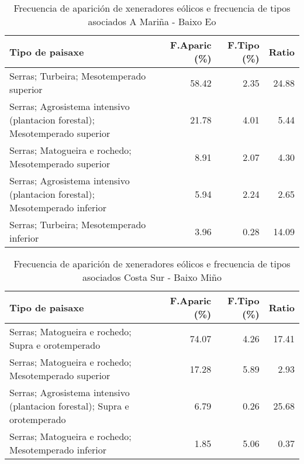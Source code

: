 \begin{table}[p]
\centering
\caption{Frecuencia de aparición de xeneradores eólicos e frecuencia de tipos asociados A Mariña - Baixo Eo} 
\label{veolico2}
\begin{tabular}{lrrr}
  \hline
Tipo de paisaxe & F.Aparic (\%) & F.Tipo (\%) & Ratio \\ 
  \hline
Serras; Turbeira; Mesotemperado superior & 58.42 & 2.35 & 24.88 \\ 
  Serras; Agrosistema intensivo (plantacion forestal); Mesotemperado superior & 21.78 & 4.01 & 5.44 \\ 
  Serras; Matogueira e rochedo; Mesotemperado superior & 8.91 & 2.07 & 4.30 \\ 
  Serras; Agrosistema intensivo (plantacion forestal); Mesotemperado inferior & 5.94 & 2.24 & 2.65 \\ 
  Serras; Turbeira; Mesotemperado inferior & 3.96 & 0.28 & 14.09 \\ 
   \hline
\end{tabular}
\end{table}
\begin{table}[p]
\centering
\caption{Frecuencia de aparición de xeneradores eólicos e frecuencia de tipos asociados Costa Sur - Baixo Miño} 
\label{veolico3}
\begin{tabular}{lrrr}
  \hline
Tipo de paisaxe & F.Aparic (\%) & F.Tipo (\%) & Ratio \\ 
  \hline
Serras; Matogueira e rochedo; Supra e orotemperado & 74.07 & 4.26 & 17.41 \\ 
  Serras; Matogueira e rochedo; Mesotemperado superior & 17.28 & 5.89 & 2.93 \\ 
  Serras; Agrosistema intensivo (plantacion forestal); Supra e orotemperado & 6.79 & 0.26 & 25.68 \\ 
  Serras; Matogueira e rochedo; Mesotemperado inferior & 1.85 & 5.06 & 0.37 \\ 
   \hline
\end{tabular}
\end{table}
